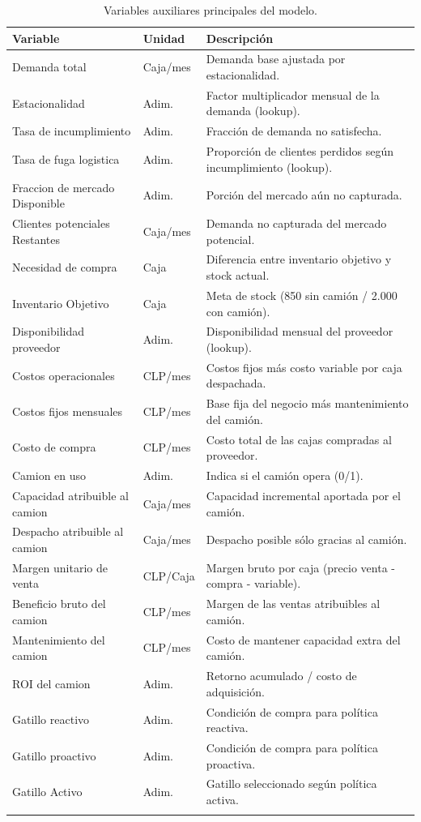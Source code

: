 \documentclass[10pt,a4paper]{article}
\begin{document}
\begin{longtable}{>{\ttfamily}p{4.2cm} p{2.8cm} p{6.5cm}}
\toprule
Variable & Unidad & Descripción \\
\midrule
\endhead
Demanda total & Caja/mes & Demanda base ajustada por estacionalidad. \\
Estacionalidad & Adim. & Factor multiplicador mensual de la demanda (lookup). \\
Tasa de incumplimiento & Adim. & Fracción de demanda no satisfecha. \\
Tasa de fuga logistica & Adim. & Proporción de clientes perdidos según incumplimiento (lookup). \\
Fraccion de mercado Disponible & Adim. & Porción del mercado aún no capturada. \\
Clientes potenciales Restantes & Caja/mes & Demanda no capturada del mercado potencial. \\
Necesidad de compra & Caja & Diferencia entre inventario objetivo y stock actual. \\
Inventario Objetivo & Caja & Meta de stock (850 sin camión / 2.000 con camión). \\
Disponibilidad proveedor & Adim. & Disponibilidad mensual del proveedor (lookup). \\
Costos operacionales & CLP/mes & Costos fijos más costo variable por caja despachada. \\
Costos fijos mensuales & CLP/mes & Base fija del negocio más mantenimiento del camión. \\
Costo de compra & CLP/mes & Costo total de las cajas compradas al proveedor. \\
Camion en uso & Adim. & Indica si el camión opera (0/1). \\
Capacidad atribuible al camion & Caja/mes & Capacidad incremental aportada por el camión. \\
Despacho atribuible al camion & Caja/mes & Despacho posible sólo gracias al camión. \\
Margen unitario de venta & CLP/Caja & Margen bruto por caja (precio venta - compra - variable). \\
Beneficio bruto del camion & CLP/mes & Margen de las ventas atribuibles al camión. \\
Mantenimiento del camion & CLP/mes & Costo de mantener capacidad extra del camión. \\
ROI del camion & Adim. & Retorno acumulado / costo de adquisición. \\
Gatillo reactivo & Adim. & Condición de compra para política reactiva. \\
Gatillo proactivo & Adim. & Condición de compra para política proactiva. \\
Gatillo Activo & Adim. & Gatillo seleccionado según política activa. \\
\bottomrule
\caption{Variables auxiliares principales del modelo.}
\end{longtable}
\end{document}
